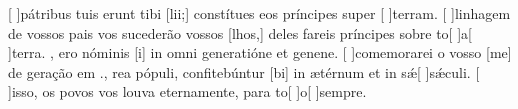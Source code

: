 {  %
  {[ ]{pá}tribus tuis erunt tibi [lii;] constítues eos príncipes super [ ]{ter}ram.}%
    {[ ]{li}nhagem de vossos pais vos sucederão vossos [\-lhos,] deles fareis príncipes sobre to[ ]{a}[ ]{ter}ra. },
  { ero nóminis [i] in omni generatióne et genene.}%
    {[ ]{co}memorarei o vosso [me] de geração em .},
  {rea pópuli, confitebúntur [bi] in ætérnum et in sǽ[ ]{sǽ}culi.}%
    {[ ]{is}so, os povos vos louva eternamente, para to[ ]{o}[ ]{sem}pre.}
}